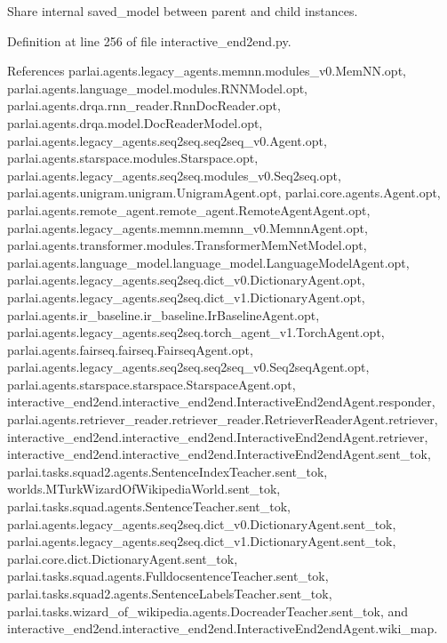 \begin{DoxyVerb}Share internal saved_model between parent and child instances.\end{DoxyVerb}
 

Definition at line 256 of file interactive\+\_\+end2end.\+py.



References parlai.\+agents.\+legacy\+\_\+agents.\+memnn.\+modules\+\_\+v0.\+Mem\+N\+N.\+opt, parlai.\+agents.\+language\+\_\+model.\+modules.\+R\+N\+N\+Model.\+opt, parlai.\+agents.\+drqa.\+rnn\+\_\+reader.\+Rnn\+Doc\+Reader.\+opt, parlai.\+agents.\+drqa.\+model.\+Doc\+Reader\+Model.\+opt, parlai.\+agents.\+legacy\+\_\+agents.\+seq2seq.\+seq2seq\+\_\+v0.\+Agent.\+opt, parlai.\+agents.\+starspace.\+modules.\+Starspace.\+opt, parlai.\+agents.\+legacy\+\_\+agents.\+seq2seq.\+modules\+\_\+v0.\+Seq2seq.\+opt, parlai.\+agents.\+unigram.\+unigram.\+Unigram\+Agent.\+opt, parlai.\+core.\+agents.\+Agent.\+opt, parlai.\+agents.\+remote\+\_\+agent.\+remote\+\_\+agent.\+Remote\+Agent\+Agent.\+opt, parlai.\+agents.\+legacy\+\_\+agents.\+memnn.\+memnn\+\_\+v0.\+Memnn\+Agent.\+opt, parlai.\+agents.\+transformer.\+modules.\+Transformer\+Mem\+Net\+Model.\+opt, parlai.\+agents.\+language\+\_\+model.\+language\+\_\+model.\+Language\+Model\+Agent.\+opt, parlai.\+agents.\+legacy\+\_\+agents.\+seq2seq.\+dict\+\_\+v0.\+Dictionary\+Agent.\+opt, parlai.\+agents.\+legacy\+\_\+agents.\+seq2seq.\+dict\+\_\+v1.\+Dictionary\+Agent.\+opt, parlai.\+agents.\+ir\+\_\+baseline.\+ir\+\_\+baseline.\+Ir\+Baseline\+Agent.\+opt, parlai.\+agents.\+legacy\+\_\+agents.\+seq2seq.\+torch\+\_\+agent\+\_\+v1.\+Torch\+Agent.\+opt, parlai.\+agents.\+fairseq.\+fairseq.\+Fairseq\+Agent.\+opt, parlai.\+agents.\+legacy\+\_\+agents.\+seq2seq.\+seq2seq\+\_\+v0.\+Seq2seq\+Agent.\+opt, parlai.\+agents.\+starspace.\+starspace.\+Starspace\+Agent.\+opt, interactive\+\_\+end2end.\+interactive\+\_\+end2end.\+Interactive\+End2end\+Agent.\+responder, parlai.\+agents.\+retriever\+\_\+reader.\+retriever\+\_\+reader.\+Retriever\+Reader\+Agent.\+retriever, interactive\+\_\+end2end.\+interactive\+\_\+end2end.\+Interactive\+End2end\+Agent.\+retriever, interactive\+\_\+end2end.\+interactive\+\_\+end2end.\+Interactive\+End2end\+Agent.\+sent\+\_\+tok, parlai.\+tasks.\+squad2.\+agents.\+Sentence\+Index\+Teacher.\+sent\+\_\+tok, worlds.\+M\+Turk\+Wizard\+Of\+Wikipedia\+World.\+sent\+\_\+tok, parlai.\+tasks.\+squad.\+agents.\+Sentence\+Teacher.\+sent\+\_\+tok, parlai.\+agents.\+legacy\+\_\+agents.\+seq2seq.\+dict\+\_\+v0.\+Dictionary\+Agent.\+sent\+\_\+tok, parlai.\+agents.\+legacy\+\_\+agents.\+seq2seq.\+dict\+\_\+v1.\+Dictionary\+Agent.\+sent\+\_\+tok, parlai.\+core.\+dict.\+Dictionary\+Agent.\+sent\+\_\+tok, parlai.\+tasks.\+squad.\+agents.\+Fulldocsentence\+Teacher.\+sent\+\_\+tok, parlai.\+tasks.\+squad2.\+agents.\+Sentence\+Labels\+Teacher.\+sent\+\_\+tok, parlai.\+tasks.\+wizard\+\_\+of\+\_\+wikipedia.\+agents.\+Docreader\+Teacher.\+sent\+\_\+tok, and interactive\+\_\+end2end.\+interactive\+\_\+end2end.\+Interactive\+End2end\+Agent.\+wiki\+\_\+map.



